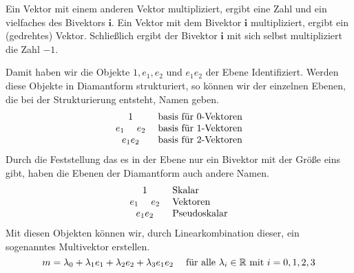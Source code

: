 \documentclass[fleqn]{scrartcl}
\numberwithin{equation}{section}
\def\*#1{\mathbf{#1}}
\begin{document}
Ein Vektor mit einem anderen Vektor multipliziert, ergibt eine Zahl und ein
vielfaches des Bivektors $\*i$. Ein Vektor mit dem Bivektor $\*i$
multipliziert, ergibt ein (gedrehtes) Vektor. Schließlich ergibt der Bivektor
$\*i$ mit sich selbst multipliziert die Zahl $-1$.

Damit haben wir die Objekte $1, e_1, e_2$ und $e_1e_2$ der Ebene
Identifiziert. Werden diese Objekte in Diamantform strukturiert, so können
wir der einzelnen Ebenen, die bei der Strukturierung entsteht, Namen geben.
\[
\begin{matrix}
    1 \\ 
    e_1\hspace{3ex} e_2 \\ 
    e_1e_2
\end{matrix}
\hspace{3ex}
\begin{matrix*}[l]
    \textrm{basis für }0\textrm{-Vektoren} \\ 
    \textrm{basis für }1\textrm{-Vektoren} \\ 
    \textrm{basis für }2\textrm{-Vektoren}
\end{matrix*}
\]
Durch die Feststellung das es in der Ebene nur ein Bivektor mit der Größe eins
gibt, haben die Ebenen der Diamantform auch andere Namen.
\[
\begin{matrix}
    1 \\ 
    e_1\hspace{3ex} e_2 \\ 
    e_1e_2
\end{matrix}
\hspace{3ex}
\begin{matrix*}[l]
    \textrm{Skalar} \\ 
    \textrm{Vektoren} \\ 
    \textrm{Pseudoskalar}
\end{matrix*}
\]
Mit diesen Objekten können wir, durch Linearkombination dieser, ein sogenanntes
Multivektor erstellen.
\[
    m = \lambda_0 + \lambda_1e_1 + \lambda_2e_2 +
    \lambda_3e_1e_2\hspace{3ex}\textrm{für alle
    }\lambda_i\in\mathbb{R}\textrm{ mit } i=0,1,2,3
\]
\end{document}
